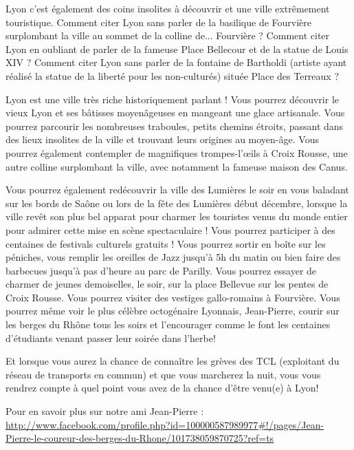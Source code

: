 Lyon c'est également des coins insolites à découvrir et une ville extrêmement
touristique. Comment citer Lyon sans parler de la basilique de Fourvière
surplombant la ville au sommet de la colline de... Fourvière ? Comment citer
Lyon en oubliant de parler de la fameuse Place Bellecour et de la statue de
Louis XIV ? Comment citer Lyon sans parler de la fontaine de Bartholdi (artiste
ayant réalisé la statue de la liberté pour les non-culturés) située
Place des Terreaux ?

Lyon est une ville très riche historiquement parlant ! Vous pourrez découvrir le
vieux Lyon et ses bâtisses moyenâgeuses en mangeant une glace artisanale. Vous
pourrez parcourir les nombreuses traboules, petits chemins étroits, passant dans
des lieux insolites de la ville et trouvant leurs origines au moyen-âge. Vous
pourrez également contempler de magnifiques trompes-l'œils à Croix Rousse, une
autre colline surplombant la ville, avec notamment la fameuse maison des Canus.


Vous pourrez également redécouvrir la ville des Lumières le soir en vous
baladant sur les bords de Saône ou lors de la fête des Lumières début décembre,
lorsque la ville revêt son plus bel apparat pour charmer les touristes
venus du monde entier pour admirer cette mise en scène spectaculaire !
Vous pourrez participer à des centaines de festivals culturels gratuits
! Vous pourrez sortir en boîte sur les péniches, vous remplir les
oreilles de Jazz jusqu'à 5h du matin ou bien faire des barbecues
jusqu'à pas d'heure au parc de Parilly. Vous pourrez essayer de
charmer de jeunes demoiselles, le soir, sur la place Bellevue sur les
pentes de Croix Rousse. Vous pourrez visiter des vestiges gallo-romains
à Fourvière. Vous pourrez même voir le plus célèbre octogénaire
Lyonnais, Jean-Pierre, courir sur les berges du Rhône tous les soirs et
l'encourager comme le font les centaines d'étudiants venant passer leur
soirée dans l'herbe!

Et lorsque vous aurez la chance de connaître les grèves des TCL (exploitant du
réseau de transports en commun) et que vous marcherez la nuit, vous vous
rendrez compte à quel point vous avez de la chance d'être venu(e) à Lyon!

Pour en savoir plus sur notre ami Jean-Pierre :
\url{http://www.facebook.com/profile.php?id=100000587989977#!/pages/Jean-Pierre-le-coureur-des-berges-du-Rhone/101738059870725?ref=ts}



